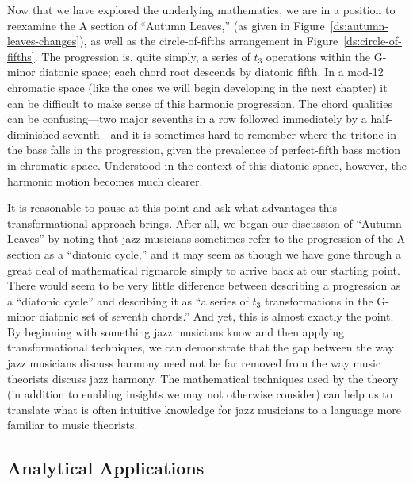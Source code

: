 Now that we have explored the underlying mathematics, we are in a position to
reexamine the A section of “Autumn Leaves,” (as given in
Figure~\ref{ds:autumn-leaves-changes}), as well as the circle-of-fifths
arrangement in Figure~\ref{ds:circle-of-fifths}. The progression is, quite
simply, a series of $t_3$ operations within the G-minor diatonic space; each
chord root descends by diatonic fifth. In a mod-12 chromatic space (like the
ones we will begin developing in the next chapter) it can be difficult to make
sense of this harmonic progression. The chord qualities can be confusing---two
major sevenths in a row followed immediately by a half-diminished
seventh---and it is sometimes hard to remember where the tritone in the bass
falls in the progression, given the prevalence of perfect-fifth bass motion in
chromatic space. Understood in the context of this diatonic space, however,
the harmonic motion becomes much clearer.

It is reasonable to pause at this point and ask what advantages this
transformational approach brings. After all, we began our discussion of
“Autumn Leaves” by noting that jazz musicians sometimes refer to the
progression of the A section as a “diatonic cycle,” and it may seem as though
we have gone through a great deal of mathematical rigmarole simply to arrive
back at our starting point. There would seem to be very little difference
between describing a progression as a “diatonic cycle” and describing it as “a
series of $t_3$ transformations in the G-minor diatonic set of seventh
chords.” And yet, this is almost exactly the point.
By beginning with something jazz musicians know and then applying
transformational techniques, we can demonstrate that the gap between the way
jazz musicians discuss harmony need not be far removed from the way music
theorists discuss jazz harmony.
The mathematical techniques used by the theory (in addition to enabling
insights we may not otherwise consider) can help us to translate what is often
intuitive knowledge for jazz musicians to a language more familiar to music
theorists.


\subsection{Analytical Applications}
\label{subsec:analytical-applications} %
\FloatBarrier

